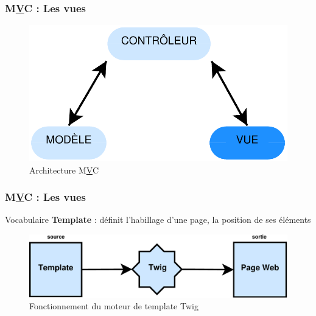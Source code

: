 \speaker{\Mathieu}

\begin{frame}
\frametitle{M\underline{V}C : Les vues}
\begin{figure}[!h]
	\begin{center}
	\includegraphics[scale=0.5]{images/mvcVue}
	\caption{Architecture M\underline{V}C}
	\end{center}
\end{figure}
\end{frame}

\begin{frame}
\frametitle{M\underline{V}C : Les vues}
\begin{block}{Vocabulaire}
\textbf{Template} : définit l'habillage d'une page, la position de ses éléments
\end{block}
\begin{figure}[!h]
	\begin{center}
	\includegraphics[scale=0.5]{images/twig}
	\caption{Fonctionnement du moteur de template Twig}
	\end{center}
\end{figure}
\end{frame}

